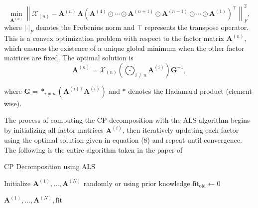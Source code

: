 \documentclass[preprint,12pt,authoryear]{elsarticle}
\begin{document}
\begin{equation}
\min_{\mathbf{A}^{(n)}} \left\| \mathcal{X}_{(n)} - \mathbf{A}^{(n)} \, \boldsymbol{\Lambda} 
\left( \mathbf{A}^{(4)} \odot \cdots \odot \mathbf{A}^{(n+1)} \odot \mathbf{A}^{(n-1)} \odot \cdots \odot \mathbf{A}^{(1)} \right)^\top 
\right\|_F^2,
\end{equation}
\noindent where $\left|\cdot\right|_{F}$ denotes the Frobenius norm and $\top$ represents the transpose operator. This is a convex optimization problem with respect to the factor matrix $\mathbf{A}^{(n)}$, which ensures the existence of a unique global minimum when the other factor matrices are fixed. The optimal solution is
\begin{equation}
\mathbf{A}^{(n)} = \mathcal{X}_{(n)} 
\left( \bigodot_{i \neq n} \mathbf{A}^{(i)} \right) 
\mathbf{G}^{-1},
\end{equation}

\noindent where 
$
\mathbf{G} = \ast_{i \neq n} \left( \mathbf{A}^{(i)\top} \mathbf{A}^{(i)} \right) 
$ and $\ast$ denotes the Hadamard product (element-wise). 

The process of computing the CP decomposition with the ALS algorithm begins by initializing all factor matrices $\mathbf{A}^{(i)}$, then iteratively updating each factor using the optimal solution given in equation (8) and repeat until convergence. The following is the entire algorithm taken in the paper of \cite{kruskal1977three}

\begin{algorithm}[H]
\caption{CP Decomposition using ALS }

Initialize $\mathbf{A}^{(1)}, \ldots, \mathbf{A}^{(N)}$ randomly or using prior knowledge\;
$\text{fit}_{\text{old}} \gets 0$\;

\Return $\mathbf{A}^{(1)}, \ldots, \mathbf{A}^{(N)}, \text{fit}$\;
\end{algorithm}
\end{document}

